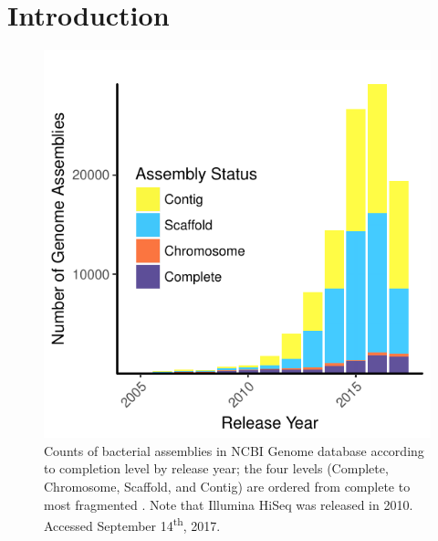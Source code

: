 \documentclass[a4,center,fleqn]{NAR}
\begin{document}
\section{Introduction}
\begin{figure}[!th]
  \centering
  \begin{center}
  \includegraphics[width=.85\columnwidth]{2017-09-14_plot1}
  \end{center}
  \caption{Counts of bacterial assemblies in NCBI Genome database according to completion level by release year; the four levels (Complete, Chromosome, Scaffold, and Contig) are ordered from complete to most fragmented \cite{Kitts2016}.  Note that Illumina HiSeq was released in 2010.  Accessed September 14\textsuperscript{th}, 2017.}
  \label{fig:completions}
\end{figure}
\end{document}
